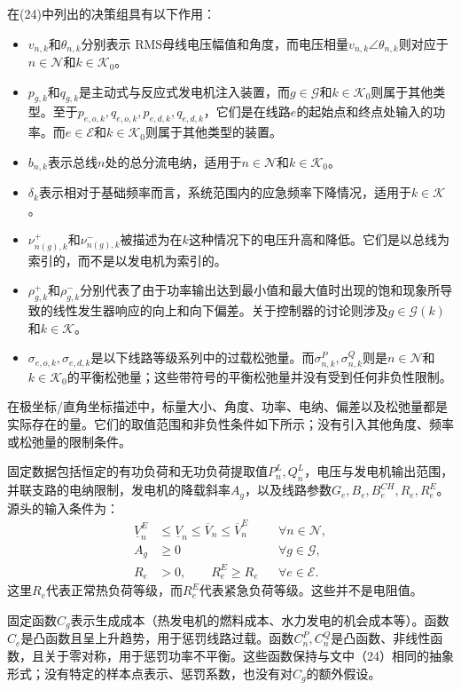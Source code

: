 \documentclass{article}
\begin{document}
在(24)中列出的决策组具有以下作用：
\begin{itemize}
\item $v_{n,k}$和$\theta_{n,k}$分别表示 RMS母线电压幅值和角度，而电压相量$v_{n,k}\angle\theta_{n,k}$则对应于$n\in\mathcal N$和$k\in\mathcal K_0$。
\item $p_{g,k}$和$q_{g,k}$是主动式与反应式发电机注入装置，而$g\in\mathcal G$和$k\in\mathcal K_0$则属于其他类型。至于$p_{e,o,k},q_{e,o,k},p_{e,d,k},q_{e,d,k}$，它们是在线路$e$的起始点和终点处输入的功率。而$e\in\mathcal E$和$k\in\mathcal K_0$则属于其他类型的装置。
\item $b_{n,k}$表示总线$n$处的总分流电纳，适用于$n\in\mathcal N$和$k\in\mathcal K_0$。
\item $\delta_k$表示相对于基础频率而言，系统范围内的应急频率下降情况，适用于$k\in\mathcal K$。
\item $\nu_{n(g),k}^{+}$和$\nu_{n(g),k}^{-}$被描述为在$k$这种情况下的电压升高和降低。它们是以总线为索引的，而不是以发电机为索引的。
\item $\rho_{g,k}^{+}$和$\rho_{g,k}^{-}$分别代表了由于功率输出达到最小值和最大值时出现的饱和现象所导致的线性发生器响应的向上和向下偏差。关于控制器的讨论则涉及$g\in\mathcal G(k)$和$k\in\mathcal K$。
\item $\sigma_{e,o,k},\sigma_{e,d,k}$是以下线路等级系列中的过载松弛量。而$\sigma_{n,k}^P,\sigma_{n,k}^Q$则是$n\in\mathcal N$和$k\in\mathcal K_0$的平衡松弛量；这些带符号的平衡松弛量并没有受到任何非负性限制。
\end{itemize}
在极坐标/直角坐标描述中，标量大小、角度、功率、电纳、偏差以及松弛量都是实际存在的量。它们的取值范围和非负性条件如下所示；没有引入其他角度、频率或松弛量的限制条件。

固定数据包括恒定的有功负荷和无功负荷提取值$P_n^L,Q_n^L$，电压与发电机输出范围，并联支路的电纳限制，发电机的降载斜率$A_g$，以及线路参数$G_e,B_e,B_e^{CH},R_e,R_e^E$。源头的输入条件为：
\begin{align*}
\underline V_n^E&\leq\underline V_n\leq\overline V_n\leq\overline V_n^E
&&\forall n\in\mathcal N,\\
A_g&\geq0 &&\forall g\in\mathcal G,\\
R_e&>0,\qquad R_e^E\geq R_e &&\forall e\in\mathcal E.
\end{align*}
这里$R_e$代表正常热负荷等级，而$R_e^E$代表紧急负荷等级。这些并不是电阻值。

固定函数$C_g$表示生成成本（热发电机的燃料成本、水力发电的机会成本等）。函数$C_e$是凸函数且呈上升趋势，用于惩罚线路过载。函数$C_n^P,C_n^Q$是凸函数、非线性函数，且关于零对称，用于惩罚功率不平衡。这些函数保持与文中（24）相同的抽象形式；没有特定的样本点表示、惩罚系数，也没有对$C_g$的额外假设。
\end{document}
